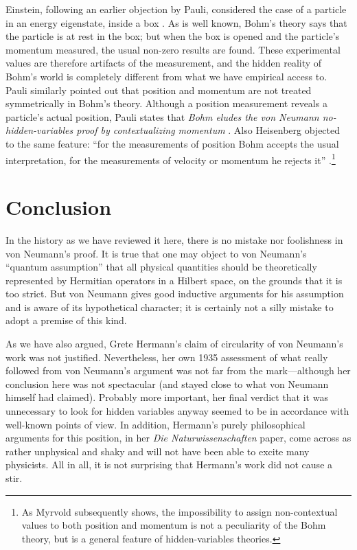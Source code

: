 \documentclass[11pt]{article}
\begin{document}
Einstein, following an earlier objection by Pauli, considered the case of a particle in an energy eigenstate, inside a box \cite[p.\@ 10]{myrvold}. As is well known, Bohm's theory says that the particle is at rest in the box; but when the box is opened and the particle's momentum measured, the usual non-zero results are found. These experimental values are therefore artifacts of the measurement, and the hidden reality of Bohm's world is completely different from what we have empirical access to. Pauli similarly pointed out that position and momentum are not treated symmetrically in Bohm's theory. Although a position measurement reveals a particle's actual position, Pauli states that \emph{Bohm eludes the von Neumann no-hidden-variables proof by contextualizing momentum} \cite[p.\@ 11]{myrvold}. Also Heisenberg objected to the same feature: ``for the measurements of position Bohm accepts the usual interpretation, for the measurements of velocity or momentum he rejects it'' \cite[p.\@ 13]{myrvold}.\footnote{As Myrvold \cite{myrvold} subsequently shows, the impossibility to assign non-contextual values to both position and momentum is not a peculiarity of the Bohm theory, but is a general feature of hidden-variables theories.}

\section{Conclusion}\label{conclusion}

In the history as we have reviewed it here, there is no mistake nor foolishness in von Neumann's proof. It is true that one may object to von Neumann's ``quantum assumption'' that all physical quantities should be theoretically represented by Hermitian operators in a Hilbert space, on the grounds that it is too strict. But von Neumann gives good inductive arguments for his assumption and is aware of its hypothetical character; it is certainly not a silly mistake to adopt a premise of this kind.

As we have also argued, Grete Hermann's claim of circularity of von Neumann's work was not justified. Nevertheless, her own 1935 assessment of what really followed from von Neumann's argument was not far from the mark---although her conclusion here was not spectacular (and stayed close to what von Neumann himself had claimed). Probably more important, her final verdict that it was unnecessary to look for hidden variables anyway seemed to be in accordance with well-known points of view. In addition, Hermann's purely philosophical arguments for this position, in her \emph{Die Naturwissenschaften} paper, come across as rather unphysical and shaky and will not have been able to excite many physicists. All in all, it is not surprising that Hermann's work did not cause a stir.
\end{document}
